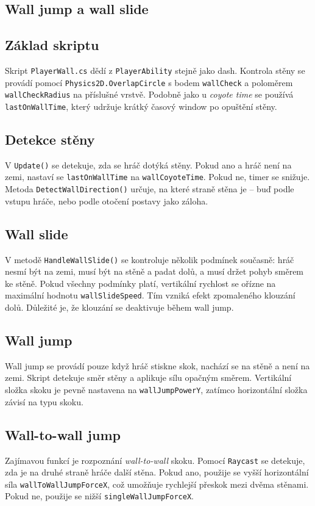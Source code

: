 \subsection{Wall jump a wall slide}

\subsection{Základ skriptu}
Skript \texttt{PlayerWall.cs} dědí z \texttt{PlayerAbility} stejně jako dash. Kontrola stěny se provádí pomocí \texttt{Physics2D.OverlapCircle} s bodem \texttt{wallCheck} a poloměrem \texttt{wallCheckRadius} na příslušné vrstvě. Podobně jako u \textit{coyote time} se používá \texttt{lastOnWallTime}, který udržuje krátký časový window po opuštění stěny.

\subsection{Detekce stěny}
V \texttt{Update()} se detekuje, zda se hráč dotýká stěny. Pokud ano a hráč není na zemi, nastaví se \texttt{lastOnWallTime} na \texttt{wallCoyoteTime}. Pokud ne, timer se snižuje. Metoda \texttt{DetectWallDirection()} určuje, na které straně stěna je -- buď podle vstupu hráče, nebo podle otočení postavy jako záloha.

\subsection{Wall slide}
V metodě \texttt{HandleWallSlide()} se kontroluje několik podmínek současně: hráč nesmí být na zemi, musí být na stěně a padat dolů, a musí držet pohyb směrem ke stěně. Pokud všechny podmínky platí, vertikální rychlost se ořízne na maximální hodnotu \texttt{wallSlideSpeed}. Tím vzniká efekt zpomaleného klouzání dolů. Důležité je, že klouzání se deaktivuje během wall jump.

\subsection{Wall jump}
Wall jump se provádí pouze když hráč stiskne skok, nachází se na stěně a není na zemi. Skript detekuje směr stěny a aplikuje sílu opačným směrem. Vertikální složka skoku je pevně nastavena na \texttt{wallJumpPowerY}, zatímco horizontální složka závisí na typu skoku.

\subsection{Wall-to-wall jump}
Zajímavou funkcí je rozpoznání \textit{wall-to-wall} skoku. Pomocí \texttt{Raycast} se detekuje, zda je na druhé straně hráče další stěna. Pokud ano, použije se vyšší horizontální síla \texttt{wallToWallJumpForceX}, což umožňuje rychlejší přeskok mezi dvěma stěnami. Pokud ne, použije se nižší \texttt{singleWallJumpForceX}.

